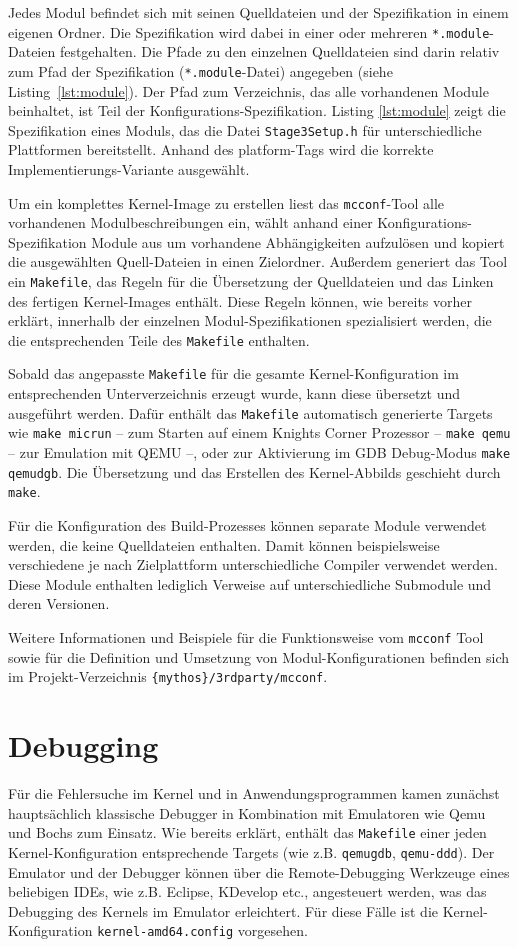 Jedes Modul befindet sich mit seinen Quelldateien und der Spezifikation in einem
eigenen Ordner. Die Spezifikation wird dabei in einer oder mehreren
\texttt{*.module}-Dateien festgehalten. Die Pfade zu den einzelnen Quelldateien
sind darin relativ zum Pfad der Spezifikation (\texttt{*.module}-Datei)
angegeben (siehe Listing~\ref{lst:module}). Der Pfad zum Verzeichnis, das alle
vorhandenen Module beinhaltet, ist Teil der Konfigurations-Spezifikation.
Listing \ref{lst:module} zeigt die Spezifikation eines Moduls, das die Datei
\texttt{Stage3Setup.h} für unterschiedliche Plattformen bereitstellt. Anhand des
platform-Tags wird die korrekte Implementierungs-Variante ausgewählt.

Um ein komplettes Kernel-Image zu erstellen liest das \texttt{mcconf}-Tool alle
vorhandenen Modulbeschreibungen ein, wählt anhand einer
Konfigurations-Spezifikation Module aus um vorhandene Abhängigkeiten aufzulösen
und kopiert die ausgewählten Quell-Dateien in einen Zielordner.
Außerdem generiert das Tool ein \texttt{Makefile}, das Regeln für die
Übersetzung der Quelldateien und das Linken des fertigen Kernel-Images enthält.
Diese Regeln können, wie bereits vorher erklärt, innerhalb der einzelnen
Modul-Spezifikationen spezialisiert werden, die die entsprechenden Teile des
\texttt{Makefile} enthalten.

Sobald das angepasste \texttt{Makefile} für die gesamte Kernel-Konfiguration im
entsprechenden Unterverzeichnis erzeugt wurde, kann diese übersetzt und
ausgeführt werden. Dafür enthält das \texttt{Makefile} automatisch generierte
Targets wie \texttt{make micrun} -- zum Starten auf einem Knights Corner
Prozessor -- \texttt{make qemu} -- zur Emulation mit QEMU --, oder zur
Aktivierung im GDB Debug-Modus \texttt{make qemudgb}. Die Übersetzung und das
Erstellen des Kernel-Abbilds geschieht durch \texttt{make}. 

Für die Konfiguration des Build-Prozesses können separate Module verwendet
werden, die keine Quelldateien enthalten. Damit können beispielsweise
verschiedene je nach Zielplattform  unterschiedliche Compiler verwendet werden.
Diese Module enthalten lediglich Verweise auf unterschiedliche
Submodule und deren Versionen.

Weitere Informationen und Beispiele für die Funktionsweise vom \texttt{mcconf}
Tool sowie für die Definition und Umsetzung von
Modul-Konfigurationen befinden sich im Projekt-Verzeichnis
\texttt{\{mythos\}/3rdparty/mcconf}.

\section{Debugging}
Für die Fehlersuche im Kernel und in Anwendungsprogrammen kamen zunächst
hauptsächlich klassische Debugger in Kombination mit Emulatoren wie Qemu und
Bochs zum Einsatz. Wie bereits erklärt, enthält das \texttt{Makefile} einer
jeden Kernel-Konfiguration entsprechende Targets (wie z.B. \texttt{qemugdb},
\texttt{qemu-ddd}). Der Emulator und der Debugger können über
die Remote-Debugging Werkzeuge eines beliebigen IDEs, wie z.B. Eclipse, KDevelop
etc., angesteuert werden, was das Debugging des Kernels im Emulator erleichtert.
Für diese Fälle ist die Kernel-Konfiguration \texttt{kernel-amd64.config}
vorgesehen.

